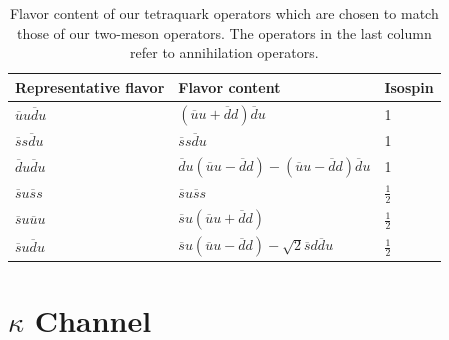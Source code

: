 \begin{table}
  \centering
  \begin{tabular}{|l|l|l|}
    \hline
    Representative flavor & Flavor content & Isospin\\
    \hline
    $\overline u u \overline d u$ & $(\overline{u} u+\overline{d} d) \overline{d} u$ & 1\\
    $\overline s s \overline d u$ & $\overline s s \overline d u$ & 1\\
    $\overline d u \overline d u$ & $\overline{d} u(\overline{u} u-\overline{d} d)-(\overline{u} u-\overline{d} d) \overline{d} u$ & 1\\
    $\overline s u \overline s s$ & $\overline s u \overline s s$ & $\frac{1}{2}$\\
    $\overline s u \overline u u$ & $\overline{s} u(\overline{u} u+\overline{d} d)$ & $\frac{1}{2}$\\
    $\overline s u \overline d u$ & $\overline{s} u(\overline{u} u-\overline{d} d)-\sqrt{2} \overline{s} d \overline{d} u$ & $\frac{1}{2}$\\
    \hline
  \end{tabular}
  \caption[Flavor content of our tetraquark operators which are chosen to match those of our two-meson operators.]{Flavor content of our tetraquark operators which are chosen to match those of our two-meson operators. The operators in the last column refer to annihilation operators.}\label{table:flavor_structs}
\end{table}

\section{$\kappa$ Channel}
